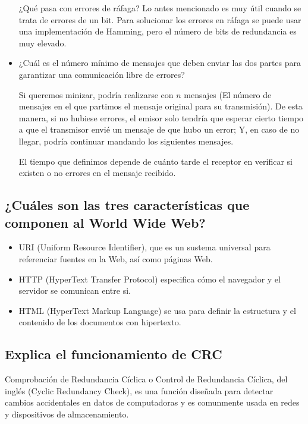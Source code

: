 \documentclass[spanish,12pt,letterpaper]{article}
\begin{document}
\begin{itemize}
  ¿Qué pasa con errores de ráfaga? Lo antes mencionado es muy útil cuando se
  trata de errores de un bit. Para solucionar los errores en ráfaga se puede usar
  una implementación de Hamming, pero el número de bits de redundancia es muy
  elevado.
  
\item ¿Cuál es el número mínimo de mensajes que deben enviar las dos partes para
  garantizar una comunicación libre de errores?

  Si queremos minizar, podría realizarse con $n$ mensajes (El número de mensajes
  en el que partimos el mensaje original para su transmisión). De esta manera, si
  no hubiese errores, el emisor solo tendría que esperar cierto tiempo a que el
  transmisor envié un mensaje de que hubo un error; Y, en caso de no llegar,
  podría continuar mandando los siguientes mensajes.

  El tiempo que definimos depende de cuánto tarde el receptor en verificar si
  existen o no errores en el mensaje recibido.

\end{itemize}

\subsection{¿Cuáles son las tres características que componen al World Wide Web?}

\begin{itemize}
\item URI (Uniform Resource Identifier), que es un sustema universal para
  referenciar fuentes en la Web, así como páginas Web.
  
\item HTTP (HyperText Transfer Protocol) especifica cómo el navegador y el
  servidor se comunican entre si.
\item HTML (HyperText Markup Language) se usa para definir la estructura y el
  contenido de los documentos con hipertexto.
\end{itemize}


\subsection{Explica el funcionamiento de CRC}

Comprobación de Redundancia Cíclica o Control de Redundancia Cíclica, del inglés
(Cyclic Redundancy Check), es una función diseñada para detectar cambios
accidentales en datos de computadoras y es comunmente usada en redes y
dispositivos de almacenamiento.
\end{document}
